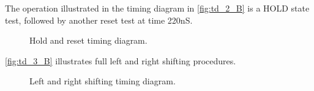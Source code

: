 \documentclass[10pt]{article}
\begin{document}
The operation illustrated in the timing diagram in \autoref{fig:td_2_B} is a HOLD state test, followed by another reset test at time 220nS.
\begin{figure}[h!t]
    \centering
    \caption{Hold and reset timing diagram.}
    \label{fig:td_2_B}
\end{figure}
\newpage

\autoref{fig:td_3_B} illustrates full left and right shifting procedures.
\begin{figure}[h!t]
    \centering
    \caption{Left and right shifting timing diagram.}
    \label{fig:td_3_B}
\end{figure}
\end{document}
